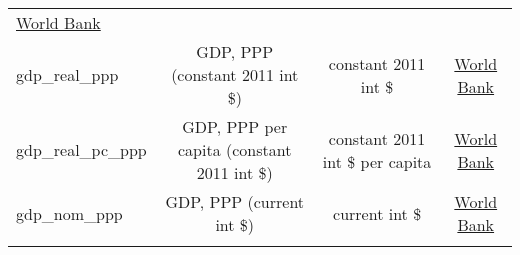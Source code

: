 \documentclass[]{article}
\begin{document}
\begin{longtable}[]{@{}lccc@{}}
\begin{minipage}[t]{0.15\columnwidth}
\href{https://data.worldbank.org/indicator/NY.GDP.MKTP.PP.KD}{World
Bank}\strut
\end{minipage}\tabularnewline
\begin{minipage}[t]{0.14\columnwidth}\raggedright\strut
gdp\_real\_ppp\strut
\end{minipage} & \begin{minipage}[t]{0.36\columnwidth}\centering\strut
GDP, PPP (constant 2011 int \$)\strut
\end{minipage} & \begin{minipage}[t]{0.24\columnwidth}\centering\strut
constant 2011 int \$\strut
\end{minipage} & \begin{minipage}[t]{0.15\columnwidth}\centering\strut
\href{https://data.worldbank.org/indicator/NY.GDP.PCAP.PP.KD}{World
Bank}\strut
\end{minipage}\tabularnewline
\begin{minipage}[t]{0.14\columnwidth}\raggedright\strut
gdp\_real\_pc\_ppp\strut
\end{minipage} & \begin{minipage}[t]{0.36\columnwidth}\centering\strut
GDP, PPP per capita (constant 2011 int \$)\strut
\end{minipage} & \begin{minipage}[t]{0.24\columnwidth}\centering\strut
constant 2011 int \$ per capita\strut
\end{minipage} & \begin{minipage}[t]{0.15\columnwidth}\centering\strut
\href{https://data.worldbank.org/indicator/NY.GDP.MKTP.PP.CD}{World
Bank}\strut
\end{minipage}\tabularnewline
\begin{minipage}[t]{0.14\columnwidth}\raggedright\strut
gdp\_nom\_ppp\strut
\end{minipage} & \begin{minipage}[t]{0.36\columnwidth}\centering\strut
GDP, PPP (current int \$)\strut
\end{minipage} & \begin{minipage}[t]{0.24\columnwidth}\centering\strut
current int \$\strut
\end{minipage} & \begin{minipage}[t]{0.15\columnwidth}\centering\strut
\href{https://data.worldbank.org/indicator/NY.GDP.PCAP.PP.CD}{World
Bank}\strut
\end{minipage}\tabularnewline
\begin{minipage}[t]{0.14\columnwidth}\raggedright\strut

\end{minipage}
\end{longtable}
\end{document}
